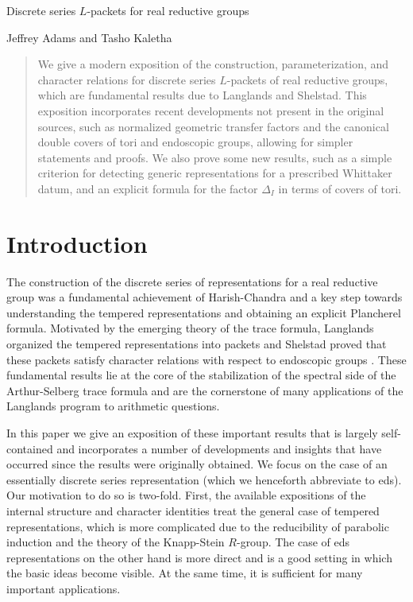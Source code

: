 \documentclass{article}
\theoremstyle{definition}
\numberwithin{equation}{section}
\renewcommand{\-}{\hyp{}}
\begin{document}
\begin{mytitle} Discrete series $L$\-packets for real reductive groups \end{mytitle}
\begin{center} Jeffrey Adams and Tasho Kaletha \end{center}

\begin{abstract}
We give a modern exposition of the construction, parameterization, and character relations for discrete series $L$\-packets of real reductive groups, which are fundamental results due to Langlands and Shelstad. This exposition incorporates recent developments not present in the original sources, such as normalized geometric transfer factors and the canonical double covers of tori and endoscopic groups, allowing for simpler statements and proofs. We also prove some new results, such as a simple criterion for detecting generic representations for a prescribed Whittaker datum, and an explicit formula for the factor $\Delta_I$ in terms of covers of tori.
\end{abstract}

\tableofcontents

\section{Introduction}

The construction of the discrete series of representations  for a real reductive group was a fundamental achievement of Harish-Chandra and a key step towards understanding the tempered representations and obtaining an explicit Plancherel formula. Motivated by the emerging theory of the trace formula, Langlands organized the tempered representations into packets \cite{Lan89} and Shelstad proved that these packets satisfy character relations with respect to endoscopic groups \cite{She82}. These fundamental results lie at the core of the stabilization of the spectral side of the Arthur-Selberg trace formula and are the cornerstone of many applications of the Langlands program to arithmetic questions. 

In this paper we give an exposition of these important results that is largely self-contained and incorporates a number of developments and insights that have occurred since the results were originally obtained. We focus on the case of an essentially discrete series representation (which we henceforth abbreviate to eds). Our motivation to do so is two-fold. First, the available expositions of the internal structure and character identities treat the general case of tempered representations, which is more complicated due to the reducibility of parabolic induction and the theory of the Knapp-Stein $R$-group. The case of eds representations on the other hand is more direct and is a good setting in which the basic ideas become visible. At the same time, it is sufficient for many important applications.
\end{document}
